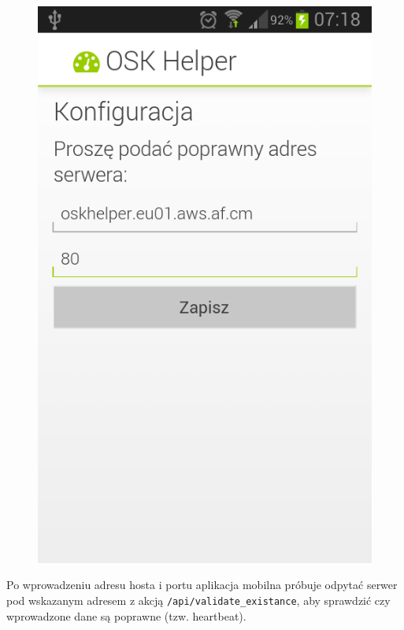 \documentclass[twoside,a4paper,openright,12pt]{book}
\begin{document}
\begin{figure}[H]
\begin{minipage}{.48\textwidth}
  \includegraphics[width=1\linewidth]{screenshots/android/konfiguracja_serwera-wypelnione.png}
  \label{fig:ekran_poczatkowy2}
\end{minipage}
\end{figure}

Po wprowadzeniu adresu hosta i portu aplikacja mobilna próbuje odpytać serwer pod wskazanym adresem z akcją \texttt{/api/validate\_existance}, aby sprawdzić czy wprowadzone dane są poprawne (tzw. heartbeat).
\end{document}
